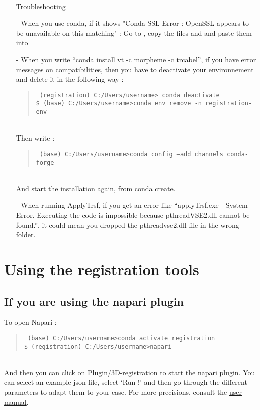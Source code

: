 \documentclass[10pt,a4paper]{book}
\newenvironment{code}[1]{\mbox{}\\[1ex]\hspace*{-#1cm}\begin{minipage}{150mm}\begin{quote}\tt}{\end{quote}\end{minipage}\mbox{}\\[1ex]}
\begin{document}
\begin{itemize}
\paragraph{}Troubleshooting
\item[-]When you use conda, if it shows "Conda SSL Error : OpenSSL appears to be unavailable on this matching" : Go to ,
copy the files  and  and paste them into 
\item[-]When you write “conda install vt -c morpheme -c trcabel”, if you have error messages on compatibilities, then you have to deactivate your environnement and delete it in the following way :
\begin{code}{0.8}
\$ (registration) C:/Users/username> conda deactivate \\
\$ (base) C:/Users/username>conda env remove -n registration-env
\end{code}
Then write :
\begin{code}{0.8}
\$ (base) C:/Users/username>conda config --add channels conda-forge \\
 \end{code}
And start the installation again, from conda create.
\item[-]When running ApplyTrsf, if you get an error like “applyTrsf.exe - System Error. Executing the code is impossible because pthreadVSE2.dll cannot be found.”, it could mean you dropped the pthreadvse2.dll file in the wrong folder.
\end{itemize}

\section{Using the registration tools}
\subsection{If you are using the napari plugin}
To open Napari :
\begin{code}{0.8}
\$ (base) C:/Users/username>conda activate registration \\
\$ (registration) C:/Users/username>napari
\end{code}
And then you can click on Plugin/3D-registration to start the napari plugin. 
You can select an example json file, select ‘Run !’  and then go through the different parameters to adapt them to your case.
For more precisions, consult the \href{https://github.com/GuignardLab/napari-3D-registration}{user manual}.
\end{document}
